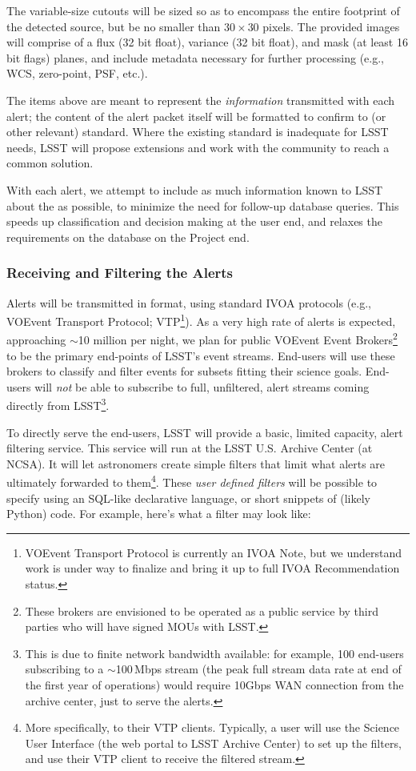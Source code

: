 The variable-size cutouts will be sized so as to encompass the entire footprint of the detected source, but be no smaller than $30 \times 30$ pixels. The provided images will comprise of a flux (32 bit float), variance (32 bit float), and mask (at least 16 bit flags) planes, and include metadata necessary for further processing (e.g., WCS, zero-point, PSF, etc.).

The items above are meant to represent the \emph{information} transmitted with each alert; the content of the alert packet itself will be formatted to confirm to \VOEvent (or other relevant) standard. Where the existing standard is inadequate for LSST needs, LSST will propose extensions and work with the community to reach a common solution.

With each alert, we attempt to include as much information known to LSST about the \DIASource as possible, to minimize the need for follow-up database queries. This speeds up classification and decision making at the user end, and relaxes the requirements on the database on the Project end.

\subsubsection{Receiving and Filtering the Alerts}
\label{sec:eventbrokers}

Alerts will be transmitted in \VOEvent format, using standard IVOA protocols (e.g., VOEvent Transport Protocol; VTP\footnote{VOEvent Transport Protocol is currently an IVOA Note, but we understand work is under way to finalize and bring it up to full IVOA Recommendation status.}). As a very high rate of alerts is expected, approaching $\sim$10 million per night, we plan for public VOEvent Event Brokers\footnote{These brokers are envisioned to be operated as a public service by third parties who will have signed MOUs with LSST.} to be the primary end-points of LSST's event streams. End-users will use these brokers to classify and filter events for subsets fitting their science goals. End-users will \emph{not} be able to subscribe to full, unfiltered, alert streams coming directly from LSST\footnote{This is due to finite network bandwidth available: for example, 100 end-users subscribing to a $\sim$100\,Mbps stream (the peak full stream data rate at end of the first year of operations) would require 10Gbps WAN connection from the archive center, just to serve the alerts.}.

To directly serve the end-users, LSST will provide a basic, limited capacity, alert filtering service. This service will run at the LSST U.S. Archive Center (at NCSA). It will let astronomers create simple filters that limit what alerts are ultimately forwarded to them\footnote{More specifically, to their VTP clients. Typically, a user will use the Science User Interface (the web portal to LSST Archive Center) to set up the filters, and use their VTP client to receive the filtered \VOEvent stream.}. These \emph{user defined filters} will be possible to specify using an SQL-like declarative language, or short snippets of (likely Python) code. For example, here's what a filter may look like:

